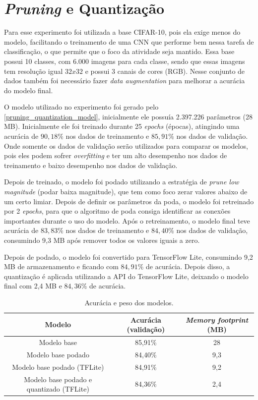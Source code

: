 \section{\textit{Pruning} e Quantização}

Para esse experimento foi utilizada a base CIFAR-10, pois ela exige menos do modelo, facilitando o treinamento de uma
CNN que performe bem nessa tarefa de classificação, o que permite que o foco da atividade seja mantido.
Essa base possui 10 classes, com  6.000 imagens para cada classe, sendo que essas imagens tem resolução igual $32x32$ e
possui 3 canais de cores (RGB). Nesse conjunto de dados também foi necessário fazer \textit{data augmentation} para
melhorar a acurácia do modelo final.

O modelo utilizado no experimento foi gerado pelo \autoref{pruning_quantization_model}, inicialmente ele possuía
2.397.226 parâmetros (28 MB). Inicialmente ele foi treinado durante 25 \textit{epochs} (épocas), atingindo
uma acurácia de $90,18\%$ nos dados de treinamento e $85,91\%$ nos dados de validação.
Onde somente os dados de validação serão utilizados para comparar os modelos, pois eles podem sofrer
\textit{overfitting} e ter um alto desempenho nos dados de treinamento e baixo desempenho nos dados de validação.

Depois de treinado, o modelo foi podado utilizando a estratégia de \textit{prune low magnitude}
(podar baixa magnitude), que tem como foco zerar valores abaixo de um certo limiar. Depois de definir os parâmetros da
poda, o modelo foi retreinado por 2 \textit{epochs}, para que o algoritmo de poda consiga identificar as conexões
importantes durante o uso do modelo.
Após o retreinamento, o modelo final teve acurácia de $83,83\%$ nos dados de treinamento e $84,40\%$ nos dados de
validação, consumindo 9,3 MB após remover todos os valores iguais a zero.

Depois de podado, o modelo foi convertido para TensorFlow Lite, consumindo 9,2 MB de armazenamento e ficando com
$84,91\%$ de acurácia. Depois disso, a quantização é aplicada utilizando a API do TensorFlow Lite, deixando o modelo
final com 2,4 MB e $84,36\%$ de acurácia.

\begin{center}
\begin{table}[htb]
\centering
\ABNTEXfontereduzida
\caption[Acurácia e peso dos modelos]{Acurácia e peso dos modelos.}
\label{tabela_acuracia_peso}
\begin{tabular}{ |c|c|c| }
	\hline
	\textbf{Modelo} & \textbf{Acurácia (validação)}  & \textbf{\textit{Memory footprint} (MB)} \\
	\hline
	Modelo base 				 & 	85,91\% 	& 	28	\\
	Modelo base podado 			 & 	84,40\% 	& 	9,3	\\
	Modelo base podado (TFLite) 		 & 	84,91\% 	& 	9,2	\\
	Modelo base podado e quantizado (TFLite) & 	84,36\% 	& 	2,4	\\
	\hline
\end{tabular}
\end{table}
\end{center}

